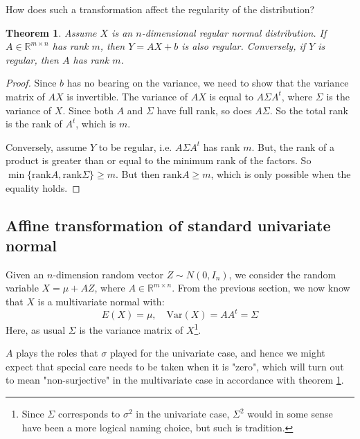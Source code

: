 \documentclass[12pt, a4paper]{article}
\newtheorem{theorem}{Theorem}[section]
\numberwithin{equation}{section}
\begin{document}
How does such a transformation affect the regularity of the distribution?

\begin{theorem}
\label{surjective_A}
Assume $X$ is an $n$-dimensional regular normal distribution. If $A\in\mathbb{R}^{m\times n}$ has rank $m$, then $Y=AX+b$ is also regular. Conversely, if $Y$ is regular, then $A$ has rank $m$.
\end{theorem}
\begin{proof}
Since $b$ has no bearing on the variance, we need to show that the variance matrix of $AX$ is invertible. The variance of $AX$ is equal to $A\Sigma A^t$, where $\Sigma$ is the variance of $X$. Since both $A$ and $\Sigma$ have full rank, so does $A\Sigma$. So the total rank is the rank of $A^t$, which is $m$.

Conversely, assume $Y$ to be regular, i.e. $A\Sigma A^t$ has rank $m$. But, the rank of a product is greater than or equal to the minimum rank of the factors. So $\min\{\textrm{rank}A,\textrm{rank}\Sigma\}\ge m$. But then $\textrm{rank}A\ge m$, which is only possible when the equality holds. 
\end{proof}

\subsection{Affine transformation of standard univariate normal}
Given an $n$-dimension random vector $Z\sim N(0,I_n)$, we consider the random variable $X=\mu+AZ$, where $A\in\mathbb{R}^{m\times n}$. From the previous section, we now know that $X$ is a multivariate normal with:
\begin{equation}
E(X)=\mu,\quad \textrm{Var}(X)=AA^t=\Sigma
\end{equation}
Here, as usual $\Sigma$ is the variance matrix of $X$\footnote{Since $\Sigma$ corresponds to $\sigma^2$ in the univariate case, $\Sigma^2$ would in some sense have been a more logical naming choice, but such is tradition.}.

$A$ plays the roles that $\sigma$ played for the univariate case, and hence we might expect that special care needs to be taken when it is "zero", which will turn out to mean "non-surjective" in the multivariate case in accordance with theorem \ref{surjective_A}.
\end{document}
